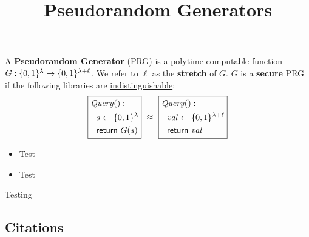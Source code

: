\documentclass{article}
\title{Pseudorandom Generators}
\begin{document}
\maketitle

\begin{definition}
  A \textbf{Pseudorandom Generator} (PRG) is a polytime computable function $G :
  \{0,1\}^\lambda \rightarrow \{0,1\}^{\lambda + \ell}$.
  We refer to $\ell$ as the \textbf{stretch} of $G$.
  $G$ is a \textbf{secure} PRG if the following libraries are \href{indist.html}{indistinguishable}:
  \begin{align*}
  \boxed{
  \begin{aligned}
    &\mathit{Query}():\\
    &~~s \gets \{0,1\}^\lambda\\
    &~~\mathsf{return}~G(s)
  \end{aligned}
  }
  ~\approx~
  \boxed{
  \begin{aligned}
    &\mathit{Query}():\\
    &~~\mathit{val} \gets \{0,1\}^{\lambda + \ell}\\
    &~~\mathsf{return}~\mathit{val}
  \end{aligned}
  }
\end{align*}
\end{definition}

\begin{itemize}
  \item Test
  \item Test
\end{itemize}

Testing \cite{Goldreich01,C:IKNP03}

\subsection*{Citations}



\end{document}
